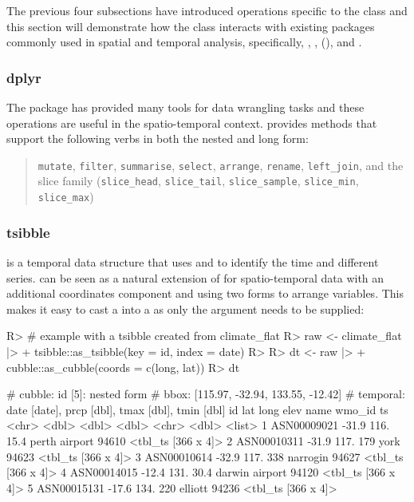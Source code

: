 \documentclass[
]{jss}
\begin{document}
The previous four subsections have introduced operations specific to the  class and this section will demonstrate how the  class interacts with existing packages commonly used in spatial and temporal analysis, specifically, , ,  (), and .

\hypertarget{dplyr}{%
\subsubsection{dplyr}\label{dplyr}}

The  package has provided many tools for data wrangling tasks and these operations are useful in the spatio-temporal context.  provides methods that support the following  verbs in both the nested and long form:

\begin{quote}
\texttt{mutate}, \texttt{filter}, \texttt{summarise}, \texttt{select}, \texttt{arrange}, \texttt{rename}, \texttt{left\_join}, and the slice family (\texttt{slice\_head}, \texttt{slice\_tail}, \texttt{slice\_sample}, \texttt{slice\_min}, \texttt{slice\_max})
\end{quote}

\hypertarget{tsibble}{%
\subsubsection{tsibble}\label{tsibble}}

 is a temporal data structure that uses  and  to identify the time and different series.  can be seen as a natural extension of  for spatio-temporal data with an additional coordinates component and using two forms to arrange variables. This makes it easy to cast a  into a  as only the  argument needs to be supplied:

\begin{CodeChunk}
\begin{CodeInput}
R> # example with a tsibble created from climate_flat
R> raw <- climate_flat |>
+   tsibble::as_tsibble(key = id, index = date)
R> 
R> dt <-  raw |>
+   cubble::as_cubble(coords = c(long, lat))
R> dt
\end{CodeInput}
\begin{CodeOutput}
# cubble:   id [5]: nested form
# bbox:     [115.97, -32.94, 133.55, -12.42]
# temporal: date [date], prcp [dbl], tmax [dbl], tmin [dbl]
  id            lat  long  elev name           wmo_id ts                
  <chr>       <dbl> <dbl> <dbl> <chr>           <dbl> <list>            
1 ASN00009021 -31.9  116.  15.4 perth airport   94610 <tbl_ts [366 x 4]>
2 ASN00010311 -31.9  117. 179   york            94623 <tbl_ts [366 x 4]>
3 ASN00010614 -32.9  117. 338   narrogin        94627 <tbl_ts [366 x 4]>
4 ASN00014015 -12.4  131.  30.4 darwin airport  94120 <tbl_ts [366 x 4]>
5 ASN00015131 -17.6  134. 220   elliott         94236 <tbl_ts [366 x 4]>
\end{CodeOutput}
\end{CodeChunk}
\end{document}
